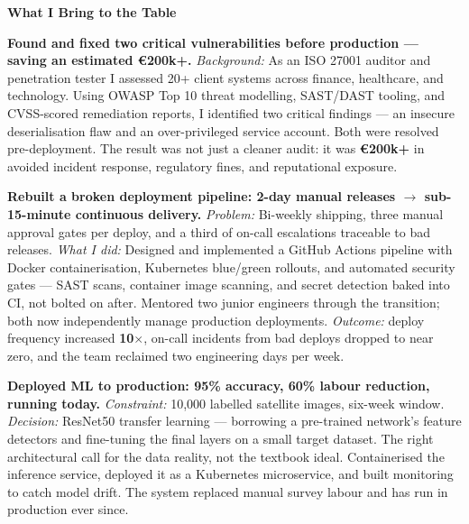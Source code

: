 \documentclass{coverletter}
\begin{document}
\vspace{0.3cm}

\noindent%
{\raggedright\sffamily\small\color{secondary}
  \llap{\color{accent}\rule[0.12ex]{3pt}{1em}\hspace{0.35em}}\textbf{What I Bring to the Table}
}

\vspace{0.1cm}

\noindent%
{\color{secondary}\sffamily\small

  \textbf{Found and fixed two critical vulnerabilities before production — saving an estimated \textbf{€200k+}.}
  \textit{Background:} As an ISO 27001 auditor and penetration tester I assessed
  20+ client systems across finance, healthcare, and technology. Using OWASP Top 10
  threat modelling, SAST/DAST tooling, and CVSS-scored remediation reports, I
  identified two critical findings — an insecure deserialisation flaw and an
  over-privileged service account. Both were resolved pre-deployment. The result was
  not just a cleaner audit: it was \textbf{€200k+} in avoided incident response,
  regulatory fines, and reputational exposure.

  \vspace{0.12cm}

  \textbf{Rebuilt a broken deployment pipeline: \textbf{2-day manual releases} $\rightarrow$ \textbf{sub-15-minute continuous delivery}.}
  \textit{Problem:} Bi-weekly shipping, three manual approval gates per deploy, and a
  third of on-call escalations traceable to bad releases. \textit{What I did:}
  Designed and implemented a GitHub Actions pipeline with Docker containerisation,
  Kubernetes blue/green rollouts, and automated security gates — SAST scans,
  container image scanning, and secret detection baked into CI, not bolted on after.
  Mentored two junior engineers through the transition; both now independently manage
  production deployments. \textit{Outcome:} deploy frequency increased \textbf{10$\times$},
  on-call incidents from bad deploys dropped to near zero, and the team reclaimed
  two engineering days per week.

  \vspace{0.12cm}

  \textbf{Deployed ML to production: \textbf{95\% accuracy}, \textbf{60\% labour reduction}, running today.}
  \textit{Constraint:} 10,000 labelled satellite images, six-week window.
  \textit{Decision:} ResNet50 transfer learning — borrowing a pre-trained network's
  feature detectors and fine-tuning the final layers on a small target dataset.
  The right architectural call for the data reality, not the textbook ideal.
  Containerised the inference service, deployed it as a Kubernetes microservice,
  and built monitoring to catch model drift. The system replaced manual survey
  labour and has run in production ever since.

}
\end{document}
